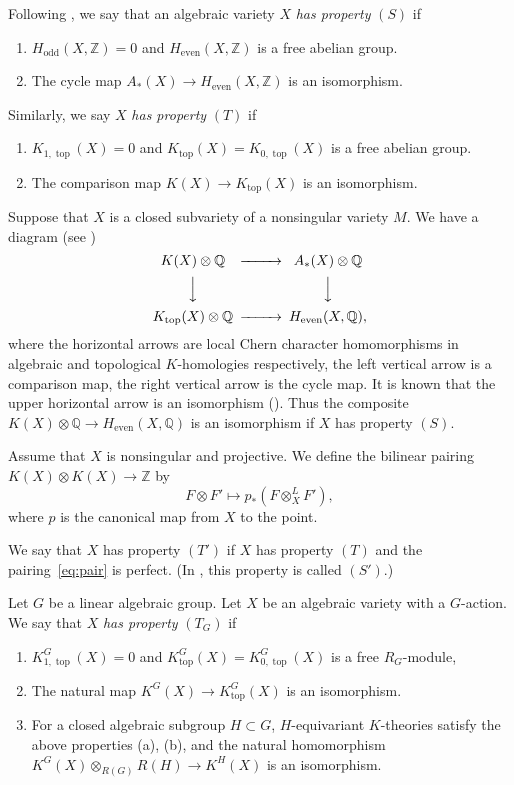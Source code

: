 \documentclass[12pt]{amsart}
\def\Bbb{\mathbb}
\renewcommand{\labelenumi}{(\theenumi)}%
\newenvironment{aenume}{%
  \begin{enumerate}%
  \renewcommand{\theenumi}{\alph{enumi}}%
  \renewcommand{\labelenumi}{(\theenumi)}%
  }{\end{enumerate}}
\theoremstyle{definition}
\theoremstyle{remark}
\numberwithin{equation}{subsection}
\newcommand{\Q}{{\Bbb Q}}
\newcommand{\Ktop}{K_{\operatorname{top}}}
\newcommand{\Kztop}{K_{0,\operatorname{top}}}
\newcommand{\Kotop}{K_{1,\operatorname{top}}}
\begin{document}
Following \cite{DLP,Lu-Base2}, we say that an algebraic variety $X$ {\it
has property\/} $(S)$ if
\begin{aenume}
\item $H_{\operatorname{odd}}(X, \mathbb Z) = 0$ and
$H_{\operatorname{even}}(X,\mathbb Z)$ is a free abelian group.
\item The cycle map $A_*(X)\to H_{\operatorname{even}}(X,\mathbb Z)$
is an isomorphism.
\end{aenume}

Similarly, we say $X$ {\it has property\/} $(T)$ if
\begin{aenume}
\item $\Kotop(X) = 0$ and $\Ktop(X) = \Kztop(X)$ is a free abelian
group.
\item The comparison map $K(X)\to \Ktop(X)$
is an isomorphism.
\end{aenume}

Suppose that $X$ is a closed subvariety of a nonsingular variety $M$.
We have a diagram (see \cite{BFM})
\begin{equation*}
\begin{CD}
   K(X)\otimes\Q @>>> A_*(X)\otimes\Q \\
     @VVV @VVV \\
   \Ktop(X)\otimes\Q @>>>
     H_{\operatorname{even}}(X,\Q),
\end{CD}
\end{equation*}
where the horizontal arrows are local Chern character homomorphisms
in algebraic and topological $K$-homologies respectively, the left
vertical arrow is a comparison map, the right vertical arrow is the
cycle map.
%
It is known that the upper horizontal arrow is an
isomorphism (\cite[15.2.16]{Fulton}). Thus the composite
$K(X)\otimes\Q\to H_{\operatorname{even}}(X,\Q)$ is an isomorphism if
$X$ has property $(S)$.

Assume that $X$ is nonsingular and projective. We define the bilinear
pairing $K(X)\otimes K(X)\to \mathbb Z$ by
\begin{equation}
\label{eq:pair}
  F\otimes F' \mapsto p_*(F\otimes^L_X F'),
\end{equation}
where $p$ is the canonical map from $X$ to the point.

We say that $X$ has property $(T')$ if $X$ has property $(T)$ and the
pairing~\eqref{eq:pair} is perfect.
(In \cite{Lu-Base2}, this property is called $(S')$.)

Let $G$ be a linear algebraic group. Let $X$ be an algebraic variety
with a $G$-action. We say that $X$ {\it has property\/} $(T_G)$ if
\begin{aenume}
\item $K^{G}_{1,\operatorname{top}}(X) = 0$ and
$\Ktop^{G}(X) = K^{G}_{0,\operatorname{top}}(X)$ is a
free $R_G$-module,
\item The natural map $K^G(X)\to \Ktop^{G}(X)$
is an isomorphism.
\item For a closed algebraic subgroup $H\subset G$, $H$-equivariant
$K$-theories satisfy the above properties (a), (b), and the natural
homomorphism $K^G(X)\otimes_{R(G)} R(H)\to K^H(X)$ is an isomorphism.
\end{aenume}
\end{document}
